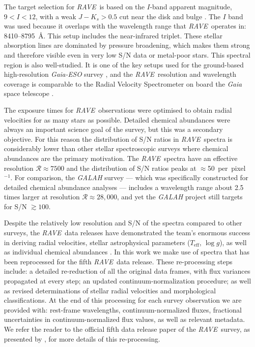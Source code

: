 \documentclass[preprint,trackchanges]{aastex}
\newcommand{\acronym}[1]{{\small{#1}}}
\newcommand{\project}[1]{\textsl{#1}}
\newcommand{\rave}{\project{\acronym{RAVE}}}
\newcommand{\teff}{T_{\mathrm{eff}}}
\newcommand{\logg}{\log g}
\begin{document}
The target selection for \rave\ is based on the $I$-band apparent magnitude,
$9 < I < 12$, with a weak $J - K_s > 0.5$ cut near the disk and bulge \citep{Wonjo_2016}.  
The $I$ band was used because it overlaps with the wavelength range that \rave\ 
operates in:  8410--8795~\AA.  This setup includes the  
near-infrared triplet.  These stellar absorption lines are dominated by pressure 
broadening, which makes them strong and therefore visible even in very low S/N data
or metal-poor stars.  This spectral region is also well-studied.  It is one of the
key setups used for the ground-based high-resolution \project{Gaia-ESO} survey
\citep{Gilmore_2012,Randich_2013}, and the \rave\ resolution and wavelength
coverage is comparable to the Radial Velocity Spectrometer on board the \project{Gaia}
space telescope \citep{Recio-Blanco_2016}.


The exposure times for \rave\ observations were optimised to obtain radial 
velocities for as many stars as possible.  Detailed chemical abundances were
always an important science goal of the survey, but this was a secondary objective.  
For this reason the distribution of S/N ratios in \rave\ spectra is considerably 
lower than other stellar spectroscopic surveys where chemical abundances are the 
primary motivation.  The \rave\ spectra have an effective resolution 
$\mathcal{R} \approx 7500$ and the distribution of S/N ratios peaks at 
$\approx$50~per~pixel$^{-1}$.  For comparison, the \project{GALAH} survey 
\citep{DeSilva_2015} --- which was specifically constructed for detailed chemical 
abundance analyses --- includes a wavelength range about 2.5 times larger at 
resolution $\mathcal{R} \approx 28,000$, and yet the \project{GALAH} project still 
targets for S/N $\gtrsim100$.


Despite the relatively low resolution and S/N of the spectra compared to other
surveys, the \rave\ data releases have demonstrated the team's enormous success 
in deriving radial velocities, stellar astrophysical parameters ($\teff$, $\logg$),
as well as individual chemical abundances \citep{Steinmetz_2006,Zwitter_2008,
Siebert_2011,Kordopatis_2013,Kunder_2016}.  In this work we make use of spectra
that has been reprocessed for the fifth \rave\ data release.  These re-processing
steps include: a detailed re-reduction of all the original data frames, with flux
variances propagated at every step; an updated continuum-normalization procedure;
as well as revised determinations of stellar radial velocities and morphological
classifications. At the end of this processing for each survey observation we are 
provided with: rest-frame wavelengths, continuum-normalized fluxes, fractional 
uncertainties in continuum-normalized flux values, as well as relevant metadata.  
We refer the reader to the official fifth data release paper of the \rave\ survey, 
as presented by \citet{Kunder_2016}, for more details of this re-processing.
\end{document}
